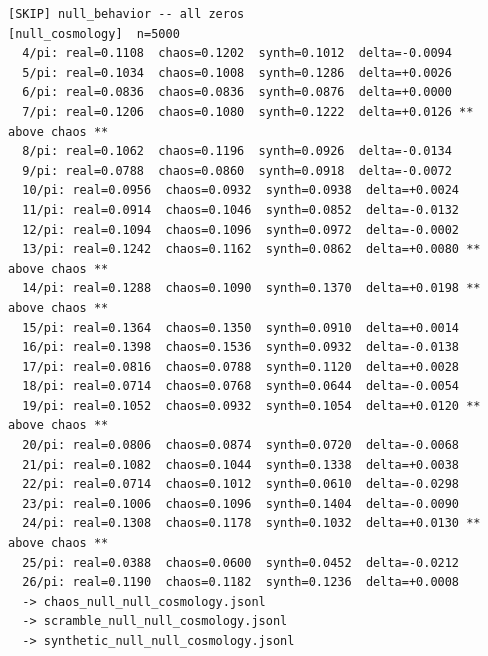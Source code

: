 \documentclass[11pt, letterpaper, openany]{book}
\begin{document}
\begin{empiricalbox}
\begin{lstlisting}[style=terminal]
[SKIP] null_behavior -- all zeros
[null_cosmology]  n=5000
  4/pi: real=0.1108  chaos=0.1202  synth=0.1012  delta=-0.0094
  5/pi: real=0.1034  chaos=0.1008  synth=0.1286  delta=+0.0026
  6/pi: real=0.0836  chaos=0.0836  synth=0.0876  delta=+0.0000
  7/pi: real=0.1206  chaos=0.1080  synth=0.1222  delta=+0.0126 ** above chaos **
  8/pi: real=0.1062  chaos=0.1196  synth=0.0926  delta=-0.0134
  9/pi: real=0.0788  chaos=0.0860  synth=0.0918  delta=-0.0072
  10/pi: real=0.0956  chaos=0.0932  synth=0.0938  delta=+0.0024
  11/pi: real=0.0914  chaos=0.1046  synth=0.0852  delta=-0.0132
  12/pi: real=0.1094  chaos=0.1096  synth=0.0972  delta=-0.0002
  13/pi: real=0.1242  chaos=0.1162  synth=0.0862  delta=+0.0080 ** above chaos **
  14/pi: real=0.1288  chaos=0.1090  synth=0.1370  delta=+0.0198 ** above chaos **
  15/pi: real=0.1364  chaos=0.1350  synth=0.0910  delta=+0.0014
  16/pi: real=0.1398  chaos=0.1536  synth=0.0932  delta=-0.0138
  17/pi: real=0.0816  chaos=0.0788  synth=0.1120  delta=+0.0028
  18/pi: real=0.0714  chaos=0.0768  synth=0.0644  delta=-0.0054
  19/pi: real=0.1052  chaos=0.0932  synth=0.1054  delta=+0.0120 ** above chaos **
  20/pi: real=0.0806  chaos=0.0874  synth=0.0720  delta=-0.0068
  21/pi: real=0.1082  chaos=0.1044  synth=0.1338  delta=+0.0038
  22/pi: real=0.0714  chaos=0.1012  synth=0.0610  delta=-0.0298
  23/pi: real=0.1006  chaos=0.1096  synth=0.1404  delta=-0.0090
  24/pi: real=0.1308  chaos=0.1178  synth=0.1032  delta=+0.0130 ** above chaos **
  25/pi: real=0.0388  chaos=0.0600  synth=0.0452  delta=-0.0212
  26/pi: real=0.1190  chaos=0.1182  synth=0.1236  delta=+0.0008
  -> chaos_null_null_cosmology.jsonl
  -> scramble_null_null_cosmology.jsonl
  -> synthetic_null_null_cosmology.jsonl


\end{lstlisting}
\end{empiricalbox}
\end{document}
